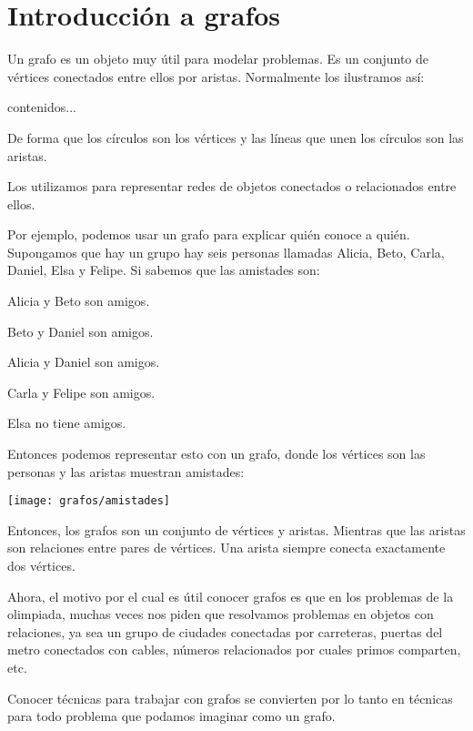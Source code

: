 \chapter{Introducción a grafos}

Un grafo es un objeto muy útil para modelar problemas. Es un conjunto de vértices conectados entre ellos por aristas. Normalmente los ilustramos así:

\begin{center}
	contenidos...
\end{center}


De forma que los círculos son los vértices y las líneas que unen los círculos son las aristas.

Los utilizamos para representar redes de objetos conectados o relacionados entre ellos. 

Por ejemplo, podemos usar un grafo para explicar quién conoce a quién. Supongamos que hay un grupo hay seis personas llamadas Alicia, Beto, Carla, Daniel, Elsa y Felipe. Si sabemos que las amistades son:
\begin{center}
	\begin{plimits}
		\item Alicia y Beto son amigos.
		\item Beto y Daniel son amigos.
		\item Alicia y Daniel son amigos.
		\item Carla y Felipe son amigos.
		\item Elsa no tiene amigos.
	\end{plimits}
\end{center}


Entonces podemos representar esto con un grafo, donde los vértices son las personas y las aristas muestran amistades:
\begin{center}
	\texttt{[image: grafos/amistades]}
\end{center}

Entonces, los grafos son un conjunto de vértices y aristas. Mientras que las aristas son relaciones entre pares de vértices. Una arista siempre conecta exactamente dos vértices.

Ahora, el motivo por el cual es útil conocer grafos es que en los problemas de la olimpiada, muchas veces nos piden que resolvamos problemas en objetos con relaciones, ya sea un grupo de ciudades conectadas por carreteras, puertas del metro conectados con cables, números relacionados por cuales primos comparten, etc.

Conocer técnicas para trabajar con grafos se convierten por lo tanto en técnicas para todo problema que podamos imaginar como un grafo. 


